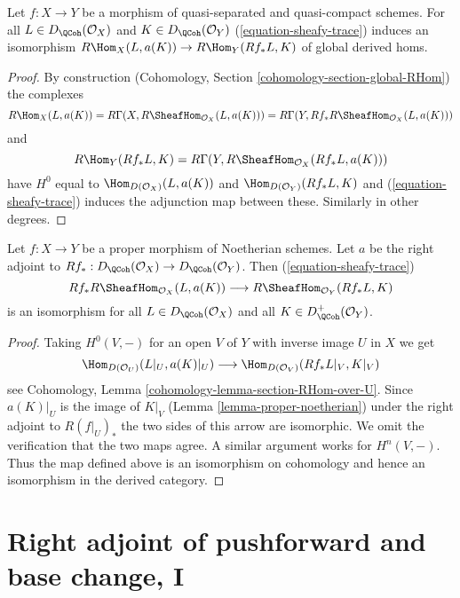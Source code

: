 \begin{lemma}
\label{lemma-iso-global-hom}
Let $f : X \to Y$ be a morphism of quasi-separated and quasi-compact
schemes.
For all $L \in D_\QCoh(\mathcal{O}_X)$ and $K \in D_\QCoh(\mathcal{O}_Y)$
(\ref{equation-sheafy-trace}) induces an isomorphism
$R\Hom_X(L, a(K)) \to R\Hom_Y(Rf_*L, K)$ of global derived homs.
\end{lemma}

\begin{proof}
By construction (Cohomology, Section \ref{cohomology-section-global-RHom})
the complexes
$$
R\Hom_X(L, a(K)) =
R\Gamma(X, R\SheafHom_{\mathcal{O}_X}(L, a(K))) =
R\Gamma(Y, Rf_*R\SheafHom_{\mathcal{O}_X}(L, a(K)))
$$
and
$$
R\Hom_Y(Rf_*L, K) = R\Gamma(Y, R\SheafHom_{\mathcal{O}_X}(Rf_*L, a(K)))
$$
have $H^0$ equal to $\Hom_{D(\mathcal{O}_X)}(L, a(K))$ and
$\Hom_{D(\mathcal{O}_Y)}(Rf_*L, K)$ and
(\ref{equation-sheafy-trace}) induces the adjunction map
between these. Similarly in other degrees.
\end{proof}

\begin{lemma}
\label{lemma-proper-noetherian-relative}
Let $f : X \to Y$ be a proper morphism of Noetherian schemes.
Let $a$ be the right adjoint to
$Rf_* : D_\QCoh(\mathcal{O}_X) \to D_\QCoh(\mathcal{O}_Y)$.
Then (\ref{equation-sheafy-trace})
$$
Rf_*R\SheafHom_{\mathcal{O}_X}(L, a(K))
\longrightarrow
R\SheafHom_{\mathcal{O}_Y}(Rf_*L, K)
$$
is an isomorphism for all $L \in D_\QCoh(\mathcal{O}_X)$ and all
$K \in D^+_\QCoh(\mathcal{O}_Y)$.
\end{lemma}

\begin{proof}
Taking $H^0(V, -)$ for an open $V$ of $Y$ with inverse image $U$ in $X$ we get
$$
\Hom_{D(\mathcal{O}_U)}(L|_U, a(K)|_U) \longrightarrow
\Hom_{D(\mathcal{O}_V)}(Rf_*L|_V, K|_V)
$$
see Cohomology, Lemma \ref{cohomology-lemma-section-RHom-over-U}.
Since $a(K)|_U$ is the image of $K|_V$ (Lemma \ref{lemma-proper-noetherian})
under the right adjoint to $R(f|_U)_*$ the two
sides of this arrow are isomorphic. We omit the verification that
the two maps agree. A similar argument works for $H^n(V, -)$.
Thus the map defined above is an isomorphism on cohomology
and hence an isomorphism in the derived category.
\end{proof}






\section{Right adjoint of pushforward and base change, I}
\label{section-base-change-map}

